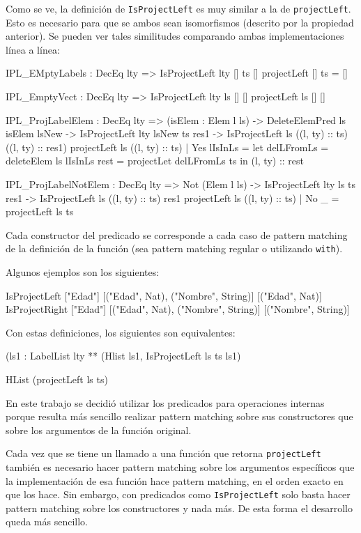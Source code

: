 Como se ve, la definición de \texttt{IsProjectLeft} es muy similar a la de \texttt{projectLeft}. Esto es necesario para que se ambos sean isomorfismos (descrito por la propiedad anterior). Se pueden ver tales similitudes comparando ambas implementaciones línea a línea:

\begin{code}
IPL_EMptyLabels : DecEq lty => IsProjectLeft {lty} [] ts []
projectLeft [] ts = []

IPL_EmptyVect : DecEq lty => IsProjectLeft {lty} ls [] []
projectLeft ls [] []

IPL_ProjLabelElem : DecEq lty => (isElem : Elem l ls) ->
  DeleteElemPred ls isElem lsNew ->
  IsProjectLeft {lty} lsNew ts res1 ->
  IsProjectLeft ls ((l, ty) :: ts) ((l, ty) :: res1)
projectLeft ls ((l, ty) :: ts) | Yes lIsInLs =
  let delLFromLs = deleteElem ls lIsInLs
    rest = projectLet delLFromLs ts
  in (l, ty) :: rest

IPL_ProjLabelNotElem : DecEq lty => Not (Elem l ls) ->
  IsProjectLeft {lty} ls ts res1 ->
  IsProjectLeft ls ((l, ty) :: ts) res1
projectLeft ls ((l, ty) :: ts) | No _ = projectLeft ls ts
\end{code}

Cada constructor del predicado se corresponde a cada caso de pattern matching de la definición de la función (sea pattern matching regular o utilizando \texttt{with}).

Algunos ejemplos son los siguientes:

\begin{code}
IsProjectLeft ["Edad"] [("Edad", Nat), ("Nombre", String)]
  [("Edad", Nat)]
IsProjectRight ["Edad"] [("Edad", Nat), ("Nombre", String)]
  [("Nombre", String)]
\end{code}

Con estas definiciones, los siguientes son equivalentes:

\begin{code}
(ls1 : LabelList lty ** (Hlist ls1, IsProjectLeft ls ts ls1)

HList (projectLeft ls ts)
\end{code}

En este trabajo se decidió utilizar los predicados para operaciones internas porque resulta más sencillo realizar pattern matching sobre sus constructores que sobre los argumentos de la función original.

Cada vez que se tiene un llamado a una función que retorna \texttt{projectLeft} también es necesario hacer pattern matching sobre los argumentos específicos que la implementación de esa función hace pattern matching, en el orden exacto en que los hace. Sin embargo, con predicados como \texttt{IsProjectLeft} solo basta hacer pattern matching sobre los constructores y nada más. De esta forma el desarrollo queda más sencillo.

